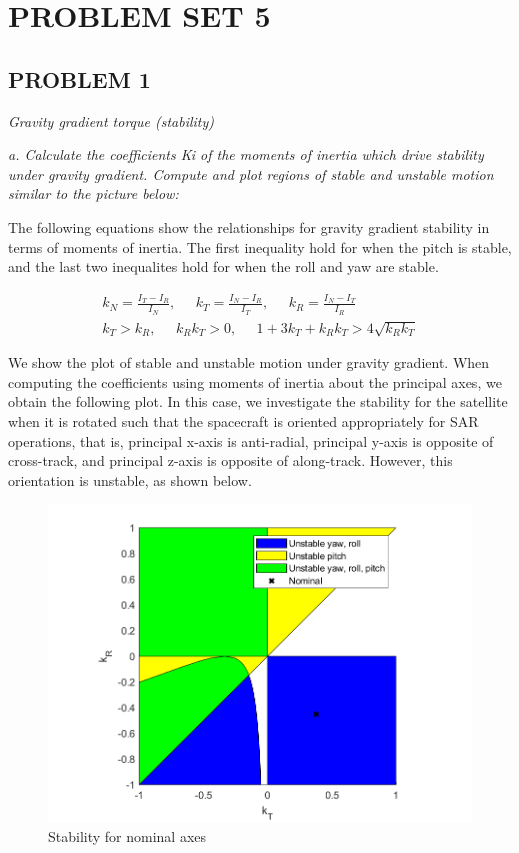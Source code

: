 \section{\Large PROBLEM SET 5}
\subsection{PROBLEM 1}
\textit{Gravity gradient torque (stability)}

\textit{a. Calculate the coefficients Ki of the moments of inertia which drive stability under gravity gradient. Compute and plot regions of stable and unstable motion similar to the picture below:}

The following equations show the relationships for gravity gradient stability in terms of moments of inertia. The first inequality hold for when the pitch is stable, and the last two inequalites hold for when the roll and yaw are stable.

\begin{align*}
    k_N = \frac{I_T - I_R}{I_N}, \;\;\;\;\;
    k_T = \frac{I_N - I_R}{I_T}, \;\;\;\;\;
    k_R = \frac{I_N - I_T}{I_R} \\
    k_T > k_R, \;\;\;\;\;
    k_R k_T > 0, \;\;\;\;\;
    1 + 3 k_T + k_R k_T > 4 \sqrt{k_R k_T}
\end{align*}

We show the plot of stable and unstable motion under gravity gradient. When computing the coefficients using moments of inertia about the principal axes, we obtain the following plot. In this case, we investigate the stability for the satellite when it is rotated such that the spacecraft is oriented appropriately for SAR operations, that is, principal x-axis is anti-radial, principal y-axis is opposite of cross-track, and principal z-axis is opposite of along-track. However, this orientation is unstable, as shown below.

\begin{figure}[H]
\centering
\includegraphics[scale=0.8]{Images/ps5_problem1a.png}
\caption{Stability for nominal axes}
\label{fig:ps5_problem1a}
\end{figure}

